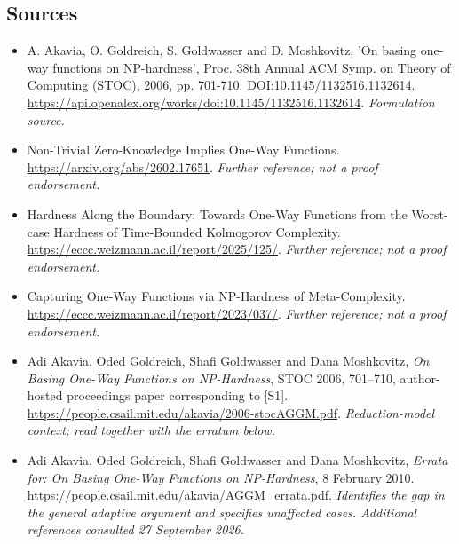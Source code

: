 \documentclass[11pt]{article}
\begin{document}
\subsection{Sources}
\begin{itemize}
\item[S1]A. Akavia, O. Goldreich, S. Goldwasser and D. Moshkovitz, 'On basing one-way functions on NP-hardness', Proc. 38th Annual ACM Symp. on Theory of Computing (STOC), 2006, pp. 701-710. DOI:10.1145/1132516.1132614.
\url{https://api.openalex.org/works/doi:10.1145/1132516.1132614}.
\textit{Formulation source.}
\item[S2]Non-Trivial Zero-Knowledge Implies One-Way Functions.
\url{https://arxiv.org/abs/2602.17651}.
\textit{Further reference; not a proof endorsement.}
\item[S3]Hardness Along the Boundary: Towards One-Way Functions from the Worst-case Hardness of Time-Bounded Kolmogorov Complexity.
\url{https://eccc.weizmann.ac.il/report/2025/125/}.
\textit{Further reference; not a proof endorsement.}
\item[S4]Capturing One-Way Functions via NP-Hardness of Meta-Complexity.
\url{https://eccc.weizmann.ac.il/report/2023/037/}.
\textit{Further reference; not a proof endorsement.}
\item[E1]Adi Akavia, Oded Goldreich, Shafi Goldwasser and Dana Moshkovitz,
\emph{On Basing One-Way Functions on NP-Hardness}, STOC 2006, 701--710,
author-hosted proceedings paper corresponding to [S1].
\url{https://people.csail.mit.edu/akavia/2006-stocAGGM.pdf}.
\textit{Reduction-model context; read together with the erratum below.}
\item[E2]Adi Akavia, Oded Goldreich, Shafi Goldwasser and Dana Moshkovitz,
\emph{Errata for: On Basing One-Way Functions on NP-Hardness},
8 February 2010.
\url{https://people.csail.mit.edu/akavia/AGGM_errata.pdf}.
\textit{Identifies the gap in the general adaptive argument and specifies
unaffected cases. Additional references consulted 27 September 2026.}
\end{itemize}
\end{document}
